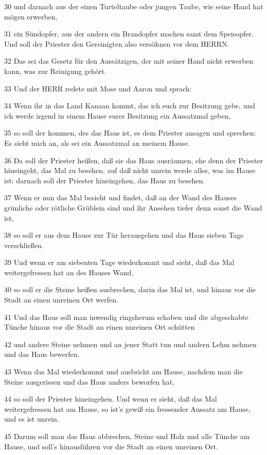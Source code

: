 \par 30 und darnach aus der einen Turteltaube oder jungen Taube, wie seine Hand hat mögen erwerben,
\par 31 ein Sündopfer, aus der andern ein Brandopfer machen samt dem Speisopfer. Und soll der Priester den Gereinigten also versöhnen vor dem HERRN.
\par 32 Das sei das Gesetz für den Aussätzigen, der mit seiner Hand nicht erwerben kann, was zur Reinigung gehört.
\par 33 Und der HERR redete mit Mose und Aaron und sprach:
\par 34 Wenn ihr in das Land Kanaan kommt, das ich euch zur Besitzung gebe, und ich werde irgend in einem Hause eurer Besitzung ein Aussatzmal geben,
\par 35 so soll der kommen, des das Haus ist, es dem Priester ansagen und sprechen: Es sieht mich an, als sei ein Aussatzmal an meinem Hause.
\par 36 Da soll der Priester heißen, daß sie das Haus ausräumen, ehe denn der Priester hineingeht, das Mal zu besehen, auf daß nicht unrein werde alles, was im Hause ist; darnach soll der Priester hineingehen, das Haus zu besehen.
\par 37 Wenn er nun das Mal besieht und findet, daß an der Wand des Hauses grünliche oder rötliche Grüblein sind und ihr Ansehen tiefer denn sonst die Wand ist,
\par 38 so soll er aus dem Hause zur Tür herausgehen und das Haus sieben Tage verschließen.
\par 39 Und wenn er am siebenten Tage wiederkommt und sieht, daß das Mal weitergefressen hat an des Hauses Wand,
\par 40 so soll er die Steine heißen ausbrechen, darin das Mal ist, und hinaus vor die Stadt an einen unreinen Ort werfen.
\par 41 Und das Haus soll man inwendig ringsherum schaben und die abgeschabte Tünche hinaus vor die Stadt an einen unreinen Ort schütten
\par 42 und andere Steine nehmen und an jener Statt tun und andern Lehm nehmen und das Haus bewerfen.
\par 43 Wenn das Mal wiederkommt und ausbricht am Hause, nachdem man die Steine ausgerissen und das Haus anders beworfen hat,
\par 44 so soll der Priester hineingehen. Und wenn er sieht, daß das Mal weitergefressen hat am Hause, so ist's gewiß ein fressender Aussatz am Hause, und es ist unrein.
\par 45 Darum soll man das Haus abbrechen, Steine und Holz und alle Tünche am Hause, und soll's hinausführen vor die Stadt an einen unreinen Ort.
